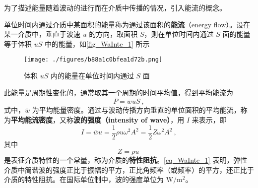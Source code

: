 
\begin{issues}
\end{issues}


为了描述能量随着波动的进行而在介质中传播的情况，引入能流的概念。

单位时间内通过介质中某面积的能量称为通过该面积的\textbf{能流}（energy flow）。设在某一介质中，垂直于波速 $u$ 的方向，取面积 $S$，则在单位时间内通过 $S$ 面的能量等于体积 $uS$ 中的能量，如\autoref{fig_WaInte_1} 所示
\begin{figure}[ht]
\centering
\texttt{[image: ./figures/b88a1c0bfea1d72b.png]}
\caption{体积 $uS$ 内的能量在单位时间内通过 $S$ 面} \label{fig_WaInte_1}
\end{figure}

此能量是周期性变化的，通常取其一个周期的时间平均值，得到平均能流为
\begin{equation}
\overline{P}=\overline{w} u S~,
\end{equation}
式中，$\overline w$ 为平均能量密度。通过与波动传播方向垂直的单位面积的平均能流，称为\textbf{平均能流密度}，又称\textbf{波的强度（intensity of wave）}，用 $I$ 来表示，即
\begin{equation} \label{eq_WaInte_1}
I=\overline{w} u=\frac{1}{2} \rho u \omega^{2} A^{2}=\frac{1}{2} Z \omega^{2} A^{2}~,
\end{equation}
其中
\begin{equation}
Z=\rho u~
\end{equation}
是表征介质特性的一个常量，称为介质的\textbf{特性阻抗}。\autoref{eq_WaInte_1} 表明，弹性介质中简谐波的强度正比于振幅的平方，正比角频率（或频率）的平方，还正比于介质的特性阻抗。在国际单位制中，波的强度单位为 $\mathrm{W}/\mathrm{m^2}$。